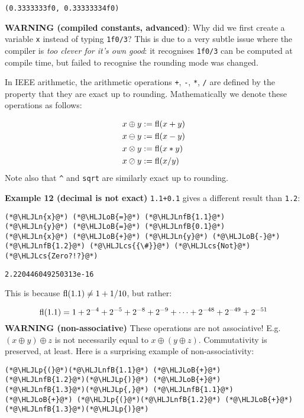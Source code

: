 \documentclass[12pt,a4paper]{article}
\newcommand{\HLJLn}[1]{#1}
\newcommand{\HLJLnfB}[1]{\textcolor[RGB]{59,151,46}{#1}}
\newcommand{\HLJLoB}[1]{\textcolor[RGB]{102,102,102}{\textbf{#1}}}
\newcommand{\HLJLp}[1]{#1}
\newcommand{\HLJLcs}[1]{\textcolor[RGB]{153,153,119}{\textit{#1}}}
\begin{document}
\begin{lstlisting}
(0.3333333f0, 0.33333334f0)
\end{lstlisting}


\textbf{WARNING (compiled constants, advanced)}: Why did we first create a variable \texttt{x} instead of typing \texttt{1f0/3}? This is due to a very subtle issue where the compiler is \emph{too clever for it's own good}: it recognises \texttt{1f0/3} can be computed at compile time, but failed to recognise the rounding mode was changed.

In IEEE arithmetic, the arithmetic operations \texttt{+}, \texttt{-}, \texttt{*}, \texttt{/} are defined by the property that they are exact up to rounding.  Mathematically we denote these operations as follows:


\begin{align*}
x\oplus y &:= {\rm fl}(x+y) \\
x\ominus y &:= {\rm fl}(x - y) \\
x\otimes y &:= {\rm fl}(x * y) \\
x\oslash y &:= {\rm fl}(x / y)
\end{align*}
Note also that  \texttt{\^{}} and \texttt{sqrt} are similarly exact up to rounding.

\textbf{Example 12 (decimal is not exact)} \texttt{1.1+0.1} gives a different result than \texttt{1.2}:


\begin{lstlisting}
(*@\HLJLn{x}@*) (*@\HLJLoB{=}@*) (*@\HLJLnfB{1.1}@*)
(*@\HLJLn{y}@*) (*@\HLJLoB{=}@*) (*@\HLJLnfB{0.1}@*)
(*@\HLJLn{x}@*) (*@\HLJLoB{+}@*) (*@\HLJLn{y}@*) (*@\HLJLoB{-}@*) (*@\HLJLnfB{1.2}@*) (*@\HLJLcs{{\#}}@*) (*@\HLJLcs{Not}@*) (*@\HLJLcs{Zero?!?}@*)
\end{lstlisting}

\begin{lstlisting}
2.220446049250313e-16
\end{lstlisting}


This is because ${\rm fl}(1.1) \neq 1+1/10$, but rather:

\[
{\rm fl}(1.1) = 1 + 2^{-4}+2^{-5} + 2^{-8}+2^{-9}+\cdots + 2^{-48}+2^{-49} + 2^{-51}
\]
\textbf{WARNING (non-associative)} These operations are not associative! E.g. $(x \oplus y) \oplus z$ is not necessarily equal to $x \oplus (y \oplus z)$. Commutativity is preserved, at least. Here is a surprising example of non-associativity:


\begin{lstlisting}
(*@\HLJLp{(}@*)(*@\HLJLnfB{1.1}@*) (*@\HLJLoB{+}@*) (*@\HLJLnfB{1.2}@*)(*@\HLJLp{)}@*) (*@\HLJLoB{+}@*) (*@\HLJLnfB{1.3}@*)(*@\HLJLp{,}@*) (*@\HLJLnfB{1.1}@*) (*@\HLJLoB{+}@*) (*@\HLJLp{(}@*)(*@\HLJLnfB{1.2}@*) (*@\HLJLoB{+}@*) (*@\HLJLnfB{1.3}@*)(*@\HLJLp{)}@*)
\end{lstlisting}
\end{document}
